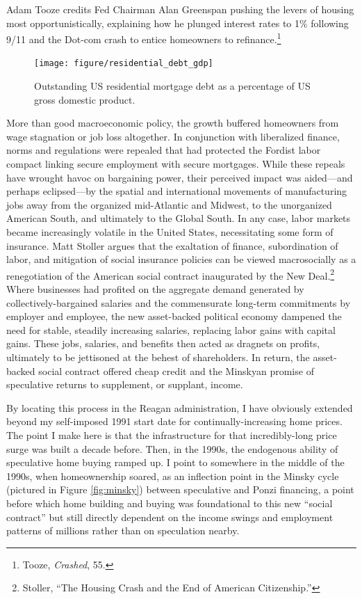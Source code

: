 \documentclass[12pt,oneside]{psthesis}
\begin{document}
Adam Tooze credits Fed Chairman Alan Greenspan pushing the levers of housing most opportunistically, explaining how he plunged interest rates to 1\% following 9/11 and the Dot-com crash to entice homeowners to refinance.\footnote{Tooze, \emph{Crashed}, 55.}
\begin{figure}

{\centering \texttt{[image: figure/residential\_debt\_gdp]} 

}

\caption{Outstanding US residential mortgage debt as a percentage of US gross domestic product.}\label{fig:hhdebt}
\end{figure}
More than good macroeconomic policy, the growth buffered homeowners from wage stagnation or job loss altogether.
In conjunction with liberalized finance, norms and regulations were repealed that had protected the Fordist labor compact linking secure employment with secure mortgages.
While these repeals have wrought havoc on bargaining power, their perceived impact was aided---and perhaps eclipsed---by the spatial and international movements of manufacturing jobs away from the organized mid-Atlantic and Midwest, to the unorganized American South, and ultimately to the Global South.
In any case, labor markets became increasingly volatile in the United States, necessitating some form of insurance.
Matt Stoller argues that the exaltation of finance, subordination of labor, and mitigation of social insurance policies can be viewed macrosocially as a renegotiation of the American social contract inaugurated by the New Deal.\footnote{Stoller, ``The Housing Crash and the End of American Citizenship.''}
Where businesses had profited on the aggregate demand generated by collectively-bargained salaries and the commensurate long-term commitments by employer and employee, the new asset-backed political economy dampened the need for stable, steadily increasing salaries, replacing labor gains with capital gains.
These jobs, salaries, and benefits then acted as dragnets on profits, ultimately to be jettisoned at the behest of shareholders.
In return, the asset-backed social contract offered cheap credit and the Minskyan promise of speculative returns to supplement, or supplant, income.

By locating this process in the Reagan administration, I have obviously extended beyond my self-imposed 1991 start date for continually-increasing home prices.
The point I make here is that the infrastructure for that incredibly-long price surge was built a decade before.
Then, in the 1990s, the endogenous ability of speculative home buying ramped up.
I point to somewhere in the middle of the 1990s, when homeownership soared, as an inflection point in the Minsky cycle (pictured in Figure \ref{fig:minsky}) between speculative and Ponzi financing, a point before which home building and buying was foundational to this new ``social contract'' but still directly dependent on the income swings and employment patterns of millions rather than on speculation nearby.
\end{document}
